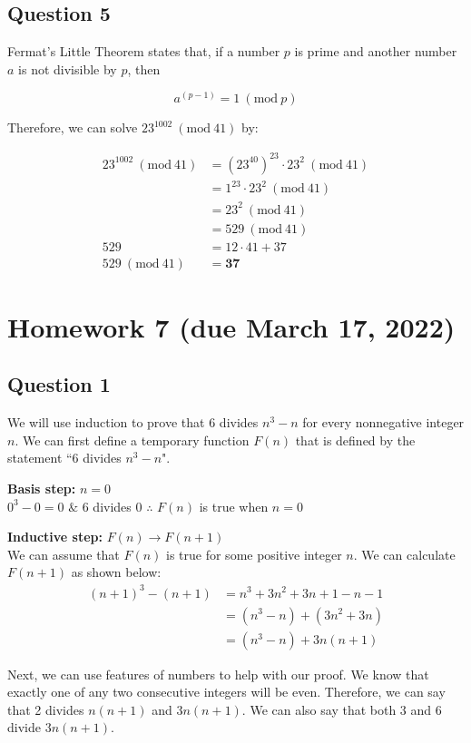 \documentclass[letterpaper, 12pt]{article}
\newcommand{\PMod}[1]{\ (\mathrm{mod}\ #1)}
\begin{document}
\subsection*{Question 5}
Fermat's Little Theorem states that, if a number $p$ is prime and another number $a$ is not divisible by $p$, then

\[a^{(p-1)} = 1 \PMod{p}\]

Therefore, we can solve $23^{1002} \PMod{41}$ by:

\begin{align*}
    23^{1002} \PMod{41} &= (23^{40})^{23} \cdot 23^2 \PMod{41}\\
    &= 1^{23} \cdot 23^2 \PMod{41}\\
    &= 23^2 \PMod{41}\\
    &= 529 \PMod{41}\\
    529 &= 12 \cdot 41 + 37\\
    529 \PMod{41} &= \boxed{\mathbf{37}}
\end{align*}

\section*{Homework 7 (due March 17, 2022)}

\subsection*{Question 1}
We will use induction to prove that 6 divides $n^3 - n$ for every nonnegative integer $n$. We can first define a temporary function $F(n)$ that is defined by the statement ``6 divides $n^3 - n$".

\textbf{Basis step: } $n = 0$\\
$0^3 - 0 = 0$ $\&$ 6 divides 0 $\therefore$ $F(n)$ is true when $n = 0$

\textbf{Inductive step: } $F(n) \to F(n + 1)$\\
We can assume that $F(n)$ is true for some positive integer $n$. We can calculate $F(n + 1)$ as shown below:
\begin{align*}
    (n + 1)^3 - (n + 1) &= n^3 + 3n^2 + 3n + 1 - n - 1\\
    &= (n^3 - n) + (3n^2 + 3n)\\
    &= (n^3 - n) + 3n(n+1)
\end{align*}

Next, we can use features of numbers to help with our proof. We know that exactly one of any two consecutive integers will be even. Therefore, we can say that 2 divides $n(n + 1)$ and $3n(n + 1)$. We can also say that both 3 and 6 divide $3n(n+1)$. 
\end{document}
